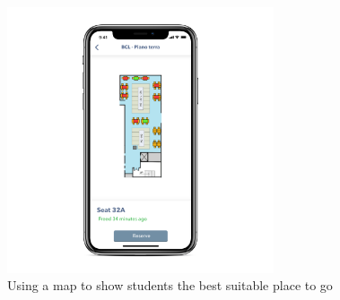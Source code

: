 \documentclass[a4paper]{article}
\begin{document}
\begin{figure}[H]
    \centering
    \includegraphics[width=0.7\textwidth]{Images/map.png}
    \caption{Using a map to show students the best suitable place to go}
\end{figure}{}



\end{document}
